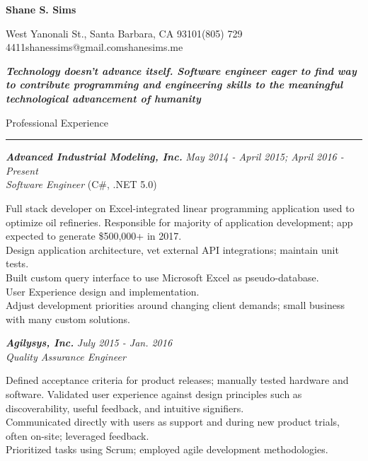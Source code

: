 \documentclass[10pt]{article}
\newcommand{\simsbullet}{{\raisebox{2pt}{\tiny $\bullet$}}\hspace{8pt}}
\newcommand{\midlinesimsbullet}{\hspace{4pt}{\raisebox{2pt}{\tiny $\bullet$}}\hspace{5pt}}
\begin{document}

{\centerline{\huge\bf\sffamily Shane S. Sims}}
\vskip 8pt
{\centerline{ West Yanonali St., Santa Barbara, CA 93101{\midlinesimsbullet}(805) 729 4411{\midlinesimsbullet}shanessims@gmail.com{\midlinesimsbullet}shanesims.me}}

\vskip 12pt

{\bf\it Technology doesn't advance itself. Software engineer eager to find way to contribute programming and engineering skills to the meaningful technological advancement of humanity}
\vskip 18pt

{\Large\sffamily Professional Experience}
\vskip 2pt
\hrule
\vskip 6pt

{\bfseries\itshape\sffamily Advanced Industrial Modeling, Inc.} \hfill \textsf{\textit{May 2014 - April 2015; April 2016 - Present}} \\
\textit{\textsf{Software Engineer}} (C\#, .NET 5.0)
\vskip 4pt

\setlength{\leftskip}{16pt}

Full stack developer on Excel-integrated linear programming application used to optimize oil refineries. 
\vskip 4pt
\simsbullet Responsible for majority of application development; app expected to generate \$500,000+ in 2017.\\
\simsbullet Design application architecture, vet external API integrations; maintain unit tests. \\
\simsbullet Built custom query interface to use Microsoft Excel as pseudo-database. \\
\simsbullet User Experience design and implementation. \\
\simsbullet Adjust development priorities around changing client demands; small business with many custom solutions. 

\setlength{\leftskip}{0pt}

\vskip 12pt

{\bfseries\itshape\sffamily Agilysys, Inc.} \hfill \textsf{\textit{July 2015 - Jan. 2016}} \\
\textit{\textsf{Quality Assurance Engineer}}
\vskip 4pt

\setlength{\leftskip}{16pt}

Defined acceptance criteria for product releases; manually tested hardware and software.
\vskip 4pt
\simsbullet Validated user experience against design principles such as discoverability, useful feedback, and intuitive signifiers. \\
\simsbullet Communicated directly with users as support and during new product trials, often on-site; leveraged feedback. \\
\simsbullet Prioritized tasks using Scrum; employed agile development methodologies.
\end{document}
